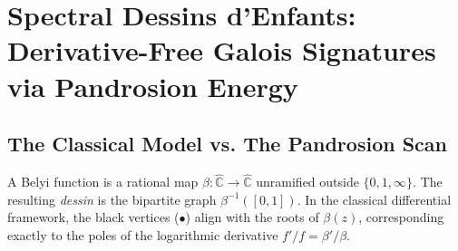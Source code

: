 
\chapter{Spectral Dessins d'Enfants: Derivative-Free Galois Signatures via Pandrosion Energy}
\graphicspath{{../../figures/}}

\begin{abstract}
Grothendieck's \emph{dessins d'enfants} are classically understood as bipartite graphs arising from the preimages $\beta^{-1}([0,1])$ of Belyi functions. This traditional approach requires computing the logarithmic derivative $\beta'/\beta$ and tracking its poles to identify the vertices of the graph. We propose a radically different architecture relying on the \textbf{Pandrosion spectral scan}. By evaluating the derivative-free Pandrosion ratio $r_s = \beta(R\omega^s e^{i\pi/d})/\beta(R\omega^s)$ strictly on a macroscopic Cauchy circle $R$, we bypass point-wise tracing. Because Belyi functions feature highly degenerate root geometries to satisfy the ramification constraints, their associated Pandrosion energy $\mathcal{E}(R) = \sum |\hat{r}_k|^2$ exhibits a rigid, quantized signature. We demonstrate that Galois conjugate dessins---which share the same multiplicity passport but possess distinct internal geometries---can be unambiguously distinguished macroscopically via their Pandrosion spectral energy, without ever plotting the graph or computing a derivative.
\end{abstract}

\section{The Classical Model vs. The Pandrosion Scan}

A Belyi function is a rational map $\beta: \hat{\mathbb{C}} \to \hat{\mathbb{C}}$ unramified outside $\{0, 1, \infty\}$. The resulting \emph{dessin} is the bipartite graph $\beta^{-1}([0, 1])$. In the classical differential framework, the black vertices ($\bullet$) align with the roots of $\beta(z)$, corresponding exactly to the poles of the logarithmic derivative $f'/f = \beta'/\beta$. 

